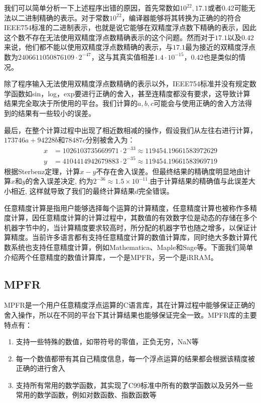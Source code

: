我们可以简单分析一下上述程序出错的原因，首先常数如$10^{22},17.1$或者$0.42$可能无法以二进制精确的表示。对于常数$10^{22}$，编译器能够将其转换为正确的的符合IEEE754标准的二进制表示，也就是说它能够在双精度浮点数下精确的表示，因此这个数不存在无法使用双精度浮点数精确表示的这个问题。然而对于$17.1$以及$0.42$来说，他们都不能以使用双精度浮点数精确的表示，与$17.1$最为接近的双精度浮点数为$2406611050876109\cdot2^{−47}$，这与其真实值相差$1.4\cdot10^{-15}$，$0.42$也是类似的情况。

除了程序输入无法使用双精度浮点数精确的表示以外，IEEE754标准并没有规定数学函数如sin，log，exp要进行正确的舍入，甚至连精度都没有要求，这导致计算结果完全取决于所使用的平台。我们计算的$a,b,c$可能会与使用正确的舍入方法得到的结果有一些较小的误差。

最后，在整个计算过程中出现了相近数相减的操作，假设我们从左往右进行计算，$173746a+94228b$和$78487c$分别被舍入为：
\begin{align*}
x & =1026103735669971·2^{-33}≈119454.19661583972629 \\
y & =4104414942679883·2^{-35}≈119454.19661583969719
\end{align*}
根据Sterbenz定理\cite{boldo:inria-00072115}，计算$x−y$不存在舍入误差。但最终结果的精确度明显地由计算$x$和$y$的舍入误差决定, 约为$2^{-36}≈1.5 \times 10^{-11} $.由于计算结果的精确值与此误差大小相近, 这样就导致了我们的最终计算结果$d$完全错误。

任意精度计算是指用户能够选择每个运算的计算精度，任意精度计算也被称作多精度计算，因任意精度计算的计算过程中，其数值的有效数字位是动态的存储在多个机器字节中的，当计算精度要求较高时，所分配的机器字节也随之增多，以保证计算精度。当前许多语言都有支持任意精度计算的数值计算库，同时绝大多数计算代数系统也支持任意精度计算，例如Mathematica\cite{ram2010}、Maple\cite{Maple10}和Sage\cite{sagemath}等。下面我们简单介绍两个任意精度的数值计算库，一个是MPFR\cite{Fousse:2007:MMB:1236463.1236468}，另一个是iRRAM\cite{10.1007/3-540-45335-0_14}。

\subsection{MPFR}

MPFR是一个用户任意精度浮点运算的C语言库，其在计算过程中能够保证正确的舍入操作，所以在不同的平台下其计算结果也能够保证完全一致。MPFR库的主要特点有：

\begin{enumerate}
\item 支持一些特殊的数值，如带符号的零值，正负无穷，NaN等
\item 每一个数值都带有其自己精度信息，每一个浮点运算的结果都会根据该精度被正确的进行舍入
\item 支持所有常用的数学函数，其实现了C99标准\cite{ISO:C99}中所有的数学函数以及另外一些常用的数学函数，例如对数函数、指数函数等
\end{enumerate}

